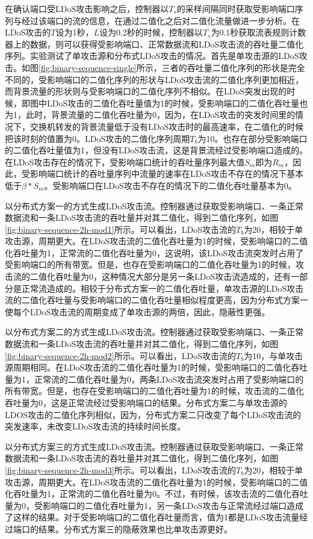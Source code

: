 在确认端口受LDoS攻击影响之后，控制器以$T_s$的采样间隔同时获取受影响端口序列与经过该端口的流的信息，在通过二值化之后对二值化流量做进一步分析。在LDoS攻击的$T$设为1秒，$L$设为0.2秒的时候，控制器以$T_s$为0.1秒获取流表规则计数器上的数据，则可以获得受影响端口、正常数据流和LDoS攻击流的吞吐量二值化序列。实验测试了单攻击源和分布式LDoS攻击的情况。首先是单攻击源的LDoS攻击。如图\ref{fig:binary-sequence-single}所示，三者的吞吐量二值化序列的形状是完全不同的，受影响端口的二值化序列的形状与LDoS攻击流的二值化序列更加相近，而背景流量的形状则与受影响端口的二值化序列不相似。在LDoS突发出现的时候，即图中LDoS攻击的二值化吞吐量值为1的时候，受影响端口的二值化吞吐量也为1，此时，背景流量的二值化吞吐量为0，因为，在LDoS攻击的突发时间里的情况下，交换机转发的背景流量低于没有LDoS攻击时的最高速率，在二值化的时候把该时刻的值置为0。LDoS攻击的二值化序列周期$T_b$为10。也存在部分受影响端口的二值化吞吐量值为1，但没有LDoS攻击流，这是背景流经过受影响端口造成的。在LDoS攻击存在的情况下，受影响端口统计的吞吐量序列最大值$S_m$即为$R_m$，因此，受影响端口统计的吞吐量序列中流量的速率在LDoS攻击不存在的情况下基本低于$\beta * S_m$。受影响端口在LDoS攻击不存在的情况下的二值化吞吐量基本为0。

以分布式方案一的方式生成LDoS攻击流。控制器通过获取受影响端口、一条正常数据流和一条LDoS攻击流的吞吐量并对其二值化，得到二值化序列，如图\ref{fig:binary-sequence-2h-mod1}所示。可以看出，LDoS攻击流的$T_b$为20，相较于单攻击源，周期更大。在LDoS攻击流的二值化吞吐量为1的时候，受影响端口的二值化吞吐量为1，正常流的二值化吞吐量为0，这说明，该LDoS攻击流突发时占用了受影响端口的所有带宽。但是，也存在受影响端口的二值化吞吐量为1的时候，攻击流的二值化吞吐量为0，这种情况大部分是另一条LDoS攻击流造成的，还有一部分是正常流造成的。相较于分布式方案一的二值化吞吐量，单攻击源的LDoS攻击流的二值化吞吐量与受影响端口的二值化吞吐量相似程度更高，因为分布式方案一使每个LDoS攻击流的周期变成了单攻击源的两倍，因此，隐蔽性更强。


以分布式方案二的方式生成LDoS攻击流。控制器通过获取受影响端口、一条正常数据流和一条LDoS攻击流的吞吐量并对其二值化，得到二值化序列，如图\ref{fig:binary-sequence-2h-mod2}所示。可以看出，LDoS攻击流的$T_b$为10，与单攻击源周期相同。在LDoS攻击流的二值化吞吐量为1的时候，受影响端口的二值化吞吐量为1，正常流的二值化吞吐量为0，两条LDoS攻击流突发时占用了受影响端口的所有带宽。但是，也存在受影响端口的二值化吞吐量为1的时候，攻击流的二值化吞吐量为0，这是正常流经过受影响端口的结果。分布式方案二与单攻击源的LDOS攻击的二值化序列相似，因为，分布式方案二只改变了每个LDoS攻击流的突发速率，未改变LDoS攻击流的持续时间长度。

以分布式方案三的方式生成LDoS攻击流。控制器通过获取受影响端口、一条正常数据流和一条LDoS攻击流的吞吐量并对其二值化，得到二值化序列，如图\ref{fig:binary-sequence-2h-mod3}所示。可以看出，LDoS攻击流的$T_b$为20，相较于单攻击源，周期更大。在LDoS攻击流的二值化吞吐量为1的时候，受影响端口的二值化吞吐量为1，正常流的二值化吞吐量为0。不过，有时候，该攻击流的二值化吞吐量为0，受影响端口的二值化吞吐量为1，另一条LDoS攻击与正常流经过端口造成了这样的结果。对于受影响端口的二值化吞吐量而言，值为1都是LDoS攻击流量经过端口的结果。分布式方案三的隐蔽效果也比单攻击源更好。

